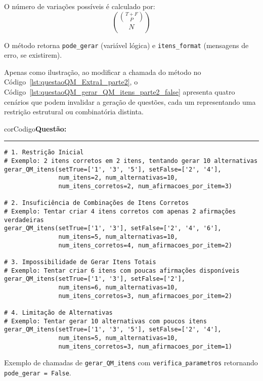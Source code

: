O número de variações possíveis é calculado por:
\begin{equation}
    \binom{\binom{T+F}{P}}{N}
\end{equation}

O método retorna \verb|pode_gerar| (variável lógica) e \verb|itens_format| (mensagens de erro, se existirem).

Apenas como ilustração, ao modificar a chamada do método no Código~\ref{lst:questaoQM_Extra1_parte2}, o Código~\ref{lst:questaoQM_gerar_QM_itens_parte2_false} apresenta quatro cenários que podem invalidar a geração de questões, cada um representando uma restrição estrutural ou combinatória distinta.

\begin{listing}[!ht]
    \begin{myboxCode}{corCodigo}{\textbf{Questão: }}\vspace{3mm}
    \hrule
    \begin{verbatim}
# 1. Restrição Inicial
# Exemplo: 2 itens corretos em 2 itens, tentando gerar 10 alternativas
gerar_QM_itens(setTrue=['1', '3', '5'], setFalse=['2', '4'], 
               num_itens=2, num_alternativas=10, 
               num_itens_corretos=2, num_afirmacoes_por_item=3)

# 2. Insuficiência de Combinações de Itens Corretos
# Exemplo: Tentar criar 4 itens corretos com apenas 2 afirmações verdadeiras
gerar_QM_itens(setTrue=['1', '3'], setFalse=['2', '4', '6'], 
               num_itens=5, num_alternativas=10, 
               num_itens_corretos=4, num_afirmacoes_por_item=2)

# 3. Impossibilidade de Gerar Itens Totais
# Exemplo: Tentar criar 6 itens com poucas afirmações disponíveis
gerar_QM_itens(setTrue=['1', '3'], setFalse=['2'], 
               num_itens=6, num_alternativas=10, 
               num_itens_corretos=3, num_afirmacoes_por_item=2)

# 4. Limitação de Alternativas
# Exemplo: Tentar gerar 10 alternativas com poucos itens
gerar_QM_itens(setTrue=['1', '3', '5'], setFalse=['2', '4'], 
               num_itens=5, num_alternativas=10, 
               num_itens_corretos=3, num_afirmacoes_por_item=1)
\end{verbatim}
\end{myboxCode}
\caption{Exemplo de chamadas de \texttt{gerar\_QM\_itens} com \texttt{verifica\_parametros} retornando \texttt{pode\_gerar = False}.}
\label{lst:questaoQM_gerar_QM_itens_parte2_false}
\end{listing}

